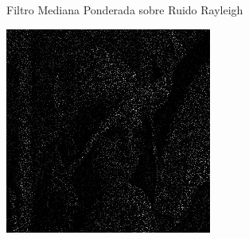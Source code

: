 \documentclass{beamer}
\begin{document}
\begin{frame}[fragile]{Filtro Mediana Ponderada sobre Ruido Rayleigh}
\begin{minipage}{0.25\linewidth}
	\end{minipage}\hfill
	\begin{minipage}{0.25\linewidth}
		\centering
		\includegraphics[width=\linewidth]{../results/lena_rayleigh_xi10}
	\end{minipage}
	

\end{frame}
\end{document}
